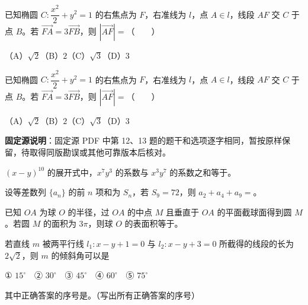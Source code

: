 \begin{question}
已知椭圆 $C:\dfrac{x^2}{2}+y^2=1$ 的右焦点为 $F$，右准线为 $l$，点 $A\in l$，线段 $AF$ 交 $C$ 于点 $B$。若 $\overrightarrow{FA}=3\overrightarrow{FB}$，则 $|\overrightarrow{AF}|=$\mbox{（　　）}

（A）$\sqrt2$\quad（B）$2$\quad（C）$\sqrt3$\quad（D）$3$

\end{question}
\begin{question}
已知椭圆 $C:\dfrac{x^2}{2}+y^2=1$ 的右焦点为 $F$，右准线为 $l$，点 $A\in l$，线段 $AF$ 交 $C$ 于点 $B$。若 $\overrightarrow{FA}=3\overrightarrow{FB}$，则 $|\overrightarrow{AF}|=$\mbox{（　　）}

（A）$\sqrt2$\quad（B）$2$\quad（C）$\sqrt3$\quad（D）$3$

\begin{gktip}
\textbf{固定源说明}：固定源 PDF 中第 12、13 题的题干和选项逐字相同，暂按原样保留，待取得同版勘误或其他可靠版本后核对。
\end{gktip}

\end{question}

\begin{question}
$(x-y)^{10}$ 的展开式中，$x^7y^3$ 的系数与 $x^3y^7$ 的系数之和等于\gkblank{}。

\end{question}
\begin{question}
设等差数列 $\{a_n\}$ 的前 $n$ 项和为 $S_n$，若 $S_9=72$，则 $a_2+a_4+a_9=$\gkblank{}。

\end{question}
\begin{question}
已知 $OA$ 为球 $O$ 的半径，过 $OA$ 的中点 $M$ 且垂直于 $OA$ 的平面截球面得到圆 $M$。若圆 $M$ 的面积为 $3\pi$，则球 $O$ 的表面积等于\gkblank{}。

\end{question}
\begin{question}
若直线 $m$ 被两平行线 $l_1:x-y+1=0$ 与 $l_2:x-y+3=0$ 所截得的线段的长为 $2\sqrt2$，则 $m$ 的倾斜角可以是

① $15^\circ$　② $30^\circ$　③ $45^\circ$　④ $60^\circ$　⑤ $75^\circ$

其中正确答案的序号是\gkblank{}。（写出所有正确答案的序号）

\end{question}

